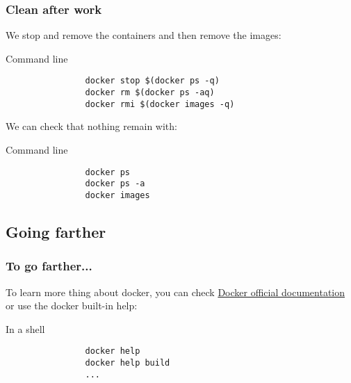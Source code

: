 	\begin{frame}[fragile]
		\frametitle{Clean after work}
		
		We stop and remove the containers and then remove the images:
		\begin{block}{Command line}
			\begin{verbatim}
				docker stop $(docker ps -q)
				docker rm $(docker ps -aq)
				docker rmi $(docker images -q)
			\end{verbatim}
		\end{block}
				
		\bigskip
		We can check that nothing remain with:
		\begin{block}{Command line}
			\begin{verbatim}
				docker ps
				docker ps -a
				docker images
			\end{verbatim}
		\end{block}

	\end{frame}
	
\subsection{Going farther}

	\begin{frame}[fragile]
		\frametitle{To go farther...}
		
		To learn more thing about docker, you can check \href{https://docs.docker.com}{Docker official documentation} or use the docker built-in help:
		
		\begin{block}{In a shell}
			\begin{verbatim}
				docker help
				docker help build
				...
			\end{verbatim}
		\end{block}
	\end{frame}